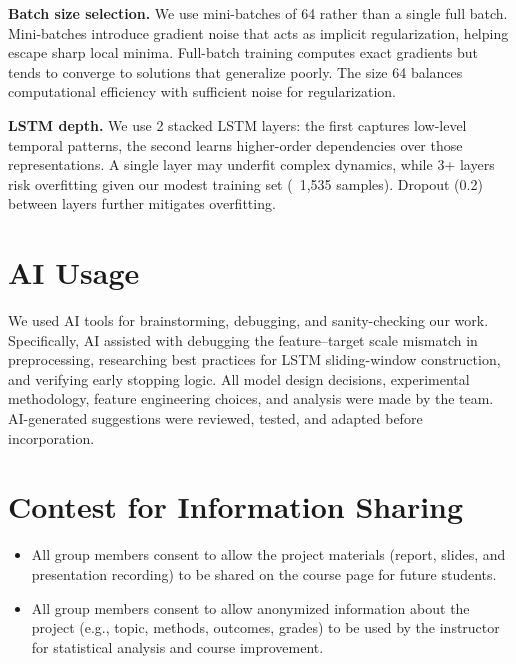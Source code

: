 \documentclass{article}
\begin{document}
\textbf{Batch size selection.} We use mini-batches of 64 rather than a single full batch. Mini-batches introduce gradient noise that acts as implicit regularization, helping escape sharp local minima. Full-batch training computes exact gradients but tends to converge to solutions that generalize poorly. The size 64 balances computational efficiency with sufficient noise for regularization.

\textbf{LSTM depth.} We use 2 stacked LSTM layers: the first captures low-level temporal patterns, the second learns higher-order dependencies over those representations. A single layer may underfit complex dynamics, while 3+ layers risk overfitting given our modest training set (~1,535 samples). Dropout (0.2) between layers further mitigates overfitting.


\section*{AI Usage}

We used AI tools for brainstorming, debugging, and sanity-checking our work. Specifically, AI assisted with debugging the feature--target scale mismatch in preprocessing, researching best practices for LSTM sliding-window construction, and verifying early stopping logic. All model design decisions, experimental methodology, feature engineering choices, and analysis were made by the team. AI-generated suggestions were reviewed, tested, and adapted before incorporation.

\section*{Contest for Information Sharing}

\begin{itemize}
	\item All group members consent to allow the project materials (report, slides, and presentation recording) to be shared on the course page for future students.
\end{itemize}

\begin{itemize}
	\item All group members consent to allow anonymized information about the project (e.g., topic, methods, outcomes, grades) to be used by the instructor for statistical analysis and course improvement.
\end{itemize}
\end{document}
